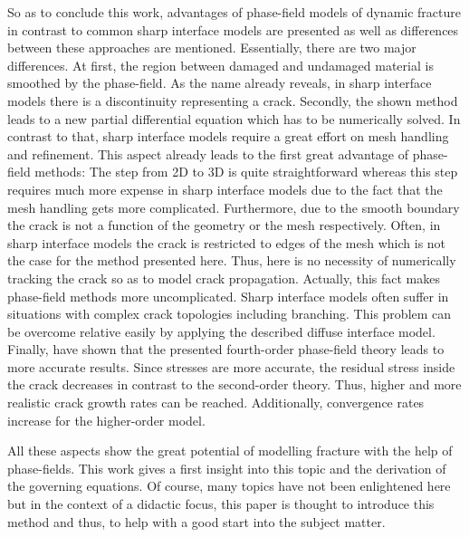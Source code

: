 So as to conclude this work, advantages of phase-field models of dynamic fracture in contrast to common sharp interface models are presented as well as differences between these approaches are mentioned. Essentially, there are two major differences. At first, the region between damaged and undamaged material is smoothed by the phase-field. As the name already reveals, in sharp interface models there is a discontinuity representing a crack. Secondly, the shown method leads to a new partial differential equation which has to be numerically solved. In contrast to that, sharp interface models require a great effort on mesh handling and refinement. This aspect already leads to the first great advantage of phase-field methods: The step from 2D to 3D is quite straightforward whereas this step requires much more expense in sharp interface models due to the fact that the mesh handling gets more complicated. Furthermore, due to the smooth boundary the crack is not a function of the geometry or the mesh respectively. Often, in sharp interface models the crack is restricted to edges of the mesh which is not the case for the method presented here. Thus, here is no necessity of numerically tracking the crack so as to model crack propagation. Actually, this fact makes phase-field methods more uncomplicated. Sharp interface models often suffer in situations with complex crack topologies including branching. This problem can be overcome relative easily by applying the described diffuse interface model. Finally, \citet{02_PF_HO_brittle} have shown that the presented fourth-order phase-field theory leads to more accurate results. Since stresses are more accurate, the residual stress inside the crack decreases in contrast to the second-order theory. Thus, higher and more realistic crack growth rates can be reached. Additionally, convergence rates increase for the higher-order model.

All these aspects show the great potential of modelling fracture with the help of phase-fields. This work gives a first insight into this topic and the derivation of the governing equations. Of course, many topics have not been enlightened here but in the context of a didactic focus, this paper is thought to introduce this method and thus, to help with a good start into the subject matter.

